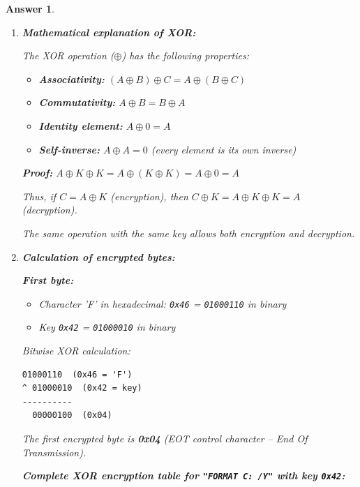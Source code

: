 \documentclass[a4paper,11pt]{article}
\theoremstyle{plain}
\newtheorem{correction}{Answer}
\theoremstyle{definition}
\begin{document}
\begin{correction}

\begin{enumerate}
\item \textbf{Mathematical explanation of XOR:}

The XOR operation ($\oplus$) has the following properties:
\begin{itemize}
\item \textbf{Associativity:} $(A \oplus B) \oplus C = A \oplus (B \oplus C)$
\item \textbf{Commutativity:} $A \oplus B = B \oplus A$
\item \textbf{Identity element:} $A \oplus 0 = A$
\item \textbf{Self-inverse:} $A \oplus A = 0$ (every element is its own inverse)
\end{itemize}

\textbf{Proof:} $A \oplus K \oplus K = A \oplus (K \oplus K) = A \oplus 0 = A$

Thus, if $C = A \oplus K$ (encryption), then $C \oplus K = A \oplus K \oplus K = A$ (decryption).

The same operation with the same key allows both encryption and decryption.

\item \textbf{Calculation of encrypted bytes:}

\textbf{First byte:}

\begin{itemize}
\item Character 'F' in hexadecimal: \texttt{0x46} = \texttt{01000110} in binary
\item Key \texttt{0x42} = \texttt{01000010} in binary
\end{itemize}

Bitwise XOR calculation:
\begin{lstlisting}[numbers=none,frame=none,backgroundcolor=\color{white}]
  01000110  (0x46 = 'F')
^ 01000010  (0x42 = key)
----------
  00000100  (0x04)
\end{lstlisting}

The first encrypted byte is \textbf{0x04} (EOT control character -- End Of Transmission).

\medskip
\textbf{Complete XOR encryption table for \texttt{"FORMAT C: /Y"} with key \texttt{0x42}:}


\end{enumerate}
\end{correction}
\end{document}
